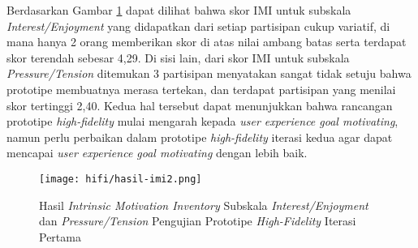 \begin{enumerate}
  \subitem  Berdasarkan Gambar \ref{img:imi2_1} dapat dilihat bahwa skor IMI untuk subskala \textit{Interest/Enjoyment} yang didapatkan dari setiap partisipan cukup variatif, di mana hanya 2 orang memberikan skor di atas nilai ambang batas serta terdapat skor terendah sebesar 4,29. Di sisi lain, dari skor IMI untuk subskala \textit{Pressure/Tension} ditemukan 3 partisipan menyatakan sangat tidak setuju bahwa prototipe membuatnya merasa tertekan, dan terdapat partisipan yang menilai skor tertinggi 2,40. Kedua hal tersebut dapat menunjukkan bahwa rancangan prototipe \textit{high-fidelity} mulai mengarah kepada \textit{user experience goal motivating}, namun perlu perbaikan dalam prototipe \textit{high-fidelity} iterasi kedua agar dapat mencapai \textit{user experience goal motivating} dengan lebih baik.

  \begin{figure}[h]
    \centering
    \texttt{[image: hifi/hasil-imi2.png]}
    \caption{Hasil \textit{Intrinsic Motivation Inventory} Subskala \textit{Interest/Enjoyment} dan \textit{Pressure/Tension} Pengujian Prototipe \textit{High-Fidelity} Iterasi Pertama}
    \label{img:imi2_1}
  \end{figure}
  \FloatBarrier

\end{enumerate}




